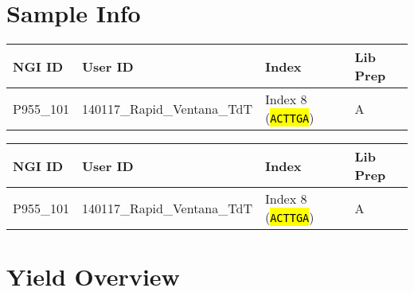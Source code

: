 \documentclass[12pt]{article}
\let\OldTexttt\texttt
\renewcommand{\texttt}[1]{\OldTexttt{\small\hl{#1}}}
\begin{document}
\section{Sample Info}\label{sample-info}

\begin{longtable}[c]{@{}llll@{}}
\toprule
NGI ID & User ID & Index & Lib Prep\tabularnewline
\midrule
\endhead
P955\_101 & 140117\_Rapid\_Ventana\_TdT & Index 8 (\texttt{ACTTGA}) &
A\tabularnewline
\bottomrule
\end{longtable}

\begin{longtable}[c]{@{}llll@{}}
\toprule
\begin{minipage}[b]{0.20\columnwidth}\raggedright\strut
NGI ID
\strut\end{minipage} &
\begin{minipage}[b]{0.30\columnwidth}\raggedright\strut
User ID
\strut\end{minipage} &
\begin{minipage}[b]{0.22\columnwidth}\raggedright\strut
Index
\strut\end{minipage} &
\begin{minipage}[b]{0.17\columnwidth}\raggedright\strut
Lib Prep
\strut\end{minipage}\tabularnewline
\midrule
\endhead
\begin{minipage}[t]{0.20\columnwidth}\raggedright\strut
P955\_101
\strut\end{minipage} &
\begin{minipage}[t]{0.30\columnwidth}\raggedright\strut
140117\_Rapid\_Ventana\_TdT
\strut\end{minipage} &
\begin{minipage}[t]{0.22\columnwidth}\raggedright\strut
Index 8 (\texttt{ACTTGA})
\strut\end{minipage} &
\begin{minipage}[t]{0.17\columnwidth}\raggedright\strut
A
\strut\end{minipage}\tabularnewline
\bottomrule
\end{longtable}

\section{Yield Overview}\label{yield-overview}
\end{document}

